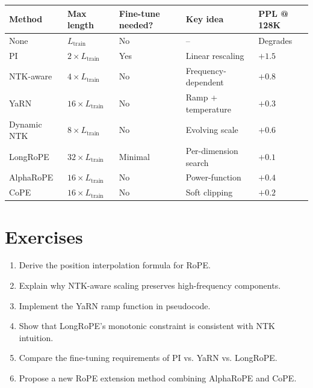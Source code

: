 \documentclass[11pt,a4paper]{book}
\theoremstyle{definition}
\begin{document}
\begin{longtable}{p{3cm}p{3cm}p{3cm}p{3cm}p{2.5cm}}
	\toprule
	\textbf{Method} & \textbf{Max length}         & \textbf{Fine-tune needed?} & \textbf{Key idea}    & \textbf{PPL @ 128K} \\
	\midrule
	None            & $L_{\text{train}}$          & No                         & --                   & Degrades            \\
	PI              & $2\times L_{\text{train}}$  & Yes                        & Linear rescaling     & $+1.5$              \\
	NTK-aware       & $4\times L_{\text{train}}$  & No                         & Frequency-dependent  & $+0.8$              \\
	YaRN            & $16\times L_{\text{train}}$ & No                         & Ramp + temperature   & $+0.3$              \\
	Dynamic NTK     & $8\times L_{\text{train}}$  & No                         & Evolving scale       & $+0.6$              \\
	LongRoPE        & $32\times L_{\text{train}}$ & Minimal                    & Per-dimension search & $+0.1$              \\
	AlphaRoPE       & $16\times L_{\text{train}}$ & No                         & Power-function       & $+0.4$              \\
	CoPE            & $16\times L_{\text{train}}$ & No                         & Soft clipping        & $+0.2$              \\
	\bottomrule
\end{longtable}

\section{Exercises}

\begin{enumerate}
	\item Derive the position interpolation formula for RoPE.
	\item Explain why NTK-aware scaling preserves high-frequency components.
	\item Implement the YaRN ramp function in pseudocode.
	\item Show that LongRoPE's monotonic constraint is consistent with NTK intuition.
	\item Compare the fine-tuning requirements of PI vs. YaRN vs. LongRoPE.
	\item Propose a new RoPE extension method combining AlphaRoPE and CoPE.
\end{enumerate}
\end{document}
